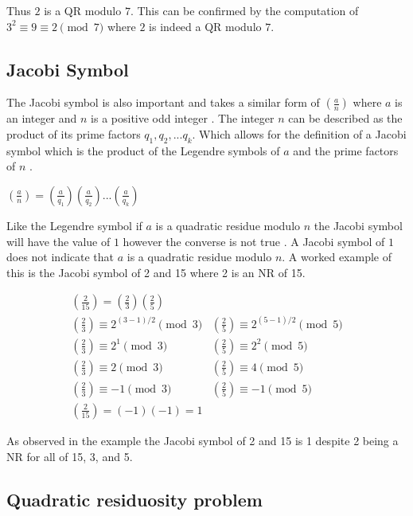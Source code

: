\documentclass{article}
\begin{document}
Thus $2$ is a QR modulo $7$. This can be confirmed by the computation of $3^2 \equiv 9 \equiv 2 \pmod {7}$ where $2$ is indeed a QR modulo $7$.

\subsection{Jacobi Symbol}

The Jacobi symbol is also important and takes a similar form of $\left(\frac{a}{n}\right)$ where $a$ is an integer and $n$ is a positive odd integer \cite{Ikenaga2019}. The integer $n$ can be described as the product of its prime factors $q_1, q_2, ... q_k$. Which allows for the definition of a Jacobi symbol which is the product of the Legendre symbols of $a$ and the prime factors of $n$ \cite{Ikenaga2019}. 

$\left(\frac{a}{n}\right) = \left(\frac{a}{q_1}\right)\left(\frac{a}{q_2}\right)...\left(\frac{a}{q_k}\right)$

Like the Legendre symbol if $a$ is a quadratic residue modulo $n$ the Jacobi symbol will have the value of $1$ however the converse is not true \cite{Ikenaga2019}. A Jacobi symbol of $1$ does not indicate that $a$ is a quadratic residue modulo $n$. A worked example of this is the Jacobi symbol of 2 and 15 where 2 is an NR of 15.

\begin{center}
$$
\begin{array}{ll}
\left(\frac{2}{15}\right) = \left(\frac{2}{3}\right) \left(\frac{2}{5}\right) \\
\left(\frac{2}{3}\right) \equiv 2^{(3-1)/2} \pmod{3} & \left(\frac{2}{5}\right) \equiv 2^{(5-1)/2} \pmod{5} \\
\left(\frac{2}{3}\right) \equiv 2^1 \pmod{3} & \left(\frac{2}{5}\right) \equiv 2^2 \pmod{5} \\
\left(\frac{2}{3}\right) \equiv 2 \pmod{3} & \left(\frac{2}{5}\right) \equiv 4 \pmod{5} \\
\left(\frac{2}{3}\right) \equiv -1 \pmod{3} & \left(\frac{2}{5}\right) \equiv -1 \pmod{5} \\
\left(\frac{2}{15}\right) = (-1) (-1) = 1
\end{array}
$$
\end{center}

As observed in the example the Jacobi symbol of 2 and 15 is 1 despite 2 being a NR for all of 15, 3, and 5.

\subsection{Quadratic residuosity problem}
\end{document}
